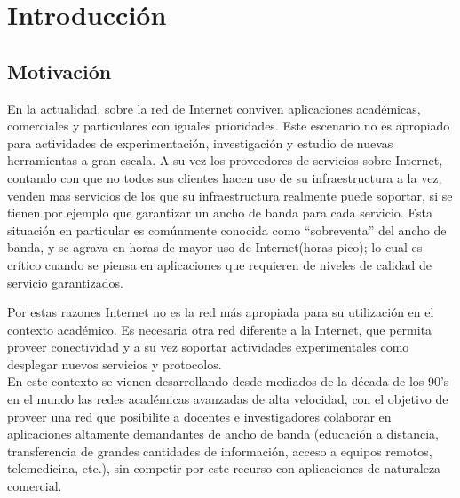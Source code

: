 
\chapter{Introducci\'on}

\ifpdf
    \graphicspath{{Chapter1/Figs/Raster/}{Chapter1/Figs/PDF/}{Chapter2/Figs/}}
\else
    \graphicspath{{Chapter1/Figs/Vector/}{Chapter1/Figs/}}
\fi


\section{Motivación}

En la actualidad, sobre la red de Internet conviven aplicaciones académicas, comerciales y particulares con iguales prioridades. Este escenario no es apropiado para actividades de experimentación, investigación y estudio de nuevas herramientas a gran escala. A su vez los proveedores de servicios sobre Internet, contando con que no todos sus clientes hacen uso de su infraestructura a la vez, venden mas servicios de los que su infraestructura realmente puede soportar, si se tienen por ejemplo que garantizar un ancho de banda para cada servicio. Esta situación en particular es comúnmente conocida como “sobreventa” del ancho de banda, y se agrava en horas de mayor uso de Internet(horas pico); lo cual es crítico cuando se piensa en aplicaciones que requieren de niveles de calidad de servicio garantizados.

Por estas razones Internet no es la red más apropiada para su utilización en el contexto académico. Es necesaria otra red diferente a la Internet, que permita proveer conectividad y a su vez soportar actividades experimentales como desplegar nuevos servicios y protocolos.\\ 

En este contexto se vienen desarrollando desde mediados de la década de los 90’s en el mundo las redes académicas avanzadas de alta velocidad, con el objetivo de proveer una red que posibilite a docentes e investigadores colaborar en aplicaciones altamente demandantes de ancho de banda (educación a distancia, transferencia de grandes cantidades de información, acceso a equipos remotos, telemedicina, etc.), sin competir por este recurso con aplicaciones de naturaleza comercial.

